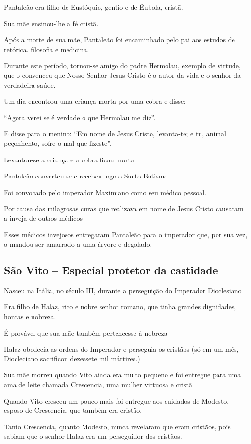 \documentclass[a4paper,12pt]{extarticle} \usepackage[utf8]{inputenc}
\begin{document}
Pantaleão era filho de Eustóquio, gentio e de Êubola, cristã.

Sua mãe ensinou-lhe a fé cristã.

Após a morte de sua mãe, Pantaleão foi encaminhado pelo pai aos estudos de retórica, filosofia e medicina.

Durante este período, tornou-se amigo do padre Hermolau, exemplo de virtude, que o convenceu que Nosso Senhor Jesus Cristo é o autor da vida e o senhor da verdadeira saúde.

Um dia encontrou uma criança morta por uma cobra e disse:

“Agora verei se é verdade o que Hermolau me diz”.

E disse para o menino: “Em nome de Jesus Cristo, levanta-te; e tu, animal peçonhento, sofre o mal que fizeste”.

Levantou-se a criança e a cobra ficou morta

Pantaleão converteu-se e recebeu logo o Santo Batismo.

Foi convocado pelo imperador Maximiano como seu médico pessoal.

Por causa das milagrosas curas que realizava em nome de Jesus Cristo causaram a inveja de outros médicos

Esses médicos invejosos entregaram Pantaleão para o imperador que, por sua vez, o mandou ser amarrado a uma árvore e degolado.


\subsection{São Vito – Especial protetor da castidade}

Nasceu na Itália, no século III, durante a perseguição do Imperador Dioclesiano

Era filho de Halaz, rico e nobre senhor romano, que tinha grandes dignidades, honras e nobreza.

É provável que sua mãe também pertencesse à nobreza

Halaz obedecia as ordens do Imperador e perseguia os cristãos (só em um mês, Diocleciano sacrificou dezessete mil mártires.)

Sua mãe morreu quando Vito ainda era muito pequeno e foi entregue para uma ama de leite chamada Crescencia, uma mulher virtuosa e cristã

Quando Vito cresceu um pouco mais foi entregue aos cuidados de Modesto, esposo de Crescencia, que também era cristão.

Tanto Crescencia, quanto Modesto, nunca revelaram que eram cristãos, pois sabiam que o senhor Halaz era um perseguidor dos cristãos.
\end{document}
